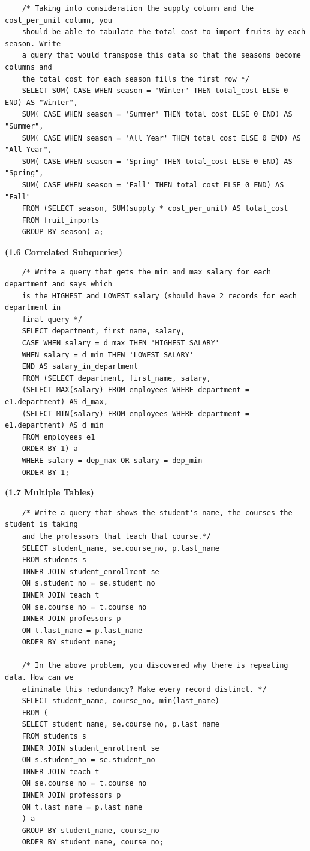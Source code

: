 \documentclass[11pt, a4paper]{article}
\begin{document}
\begin{spacing}{1.1}
\begin{lstlisting}
	/* Taking into consideration the supply column and the cost_per_unit column, you 
	should be able to tabulate the total cost to import fruits by each season. Write 
	a query that would transpose this data so that the seasons become columns and 
	the total cost for each season fills the first row */
	SELECT SUM( CASE WHEN season = 'Winter' THEN total_cost ELSE 0 END) AS "Winter",
	SUM( CASE WHEN season = 'Summer' THEN total_cost ELSE 0 END) AS "Summer",
	SUM( CASE WHEN season = 'All Year' THEN total_cost ELSE 0 END) AS "All Year",
	SUM( CASE WHEN season = 'Spring' THEN total_cost ELSE 0 END) AS "Spring",
	SUM( CASE WHEN season = 'Fall' THEN total_cost ELSE 0 END) AS "Fall"
	FROM (SELECT season, SUM(supply * cost_per_unit) AS total_cost
	FROM fruit_imports
	GROUP BY season) a; \end{lstlisting} \newpage
	\noindent \large \textbf{(1.6 Correlated Subqueries)} \normalsize
	\begin{lstlisting}
	/* Write a query that gets the min and max salary for each department and says which 
	is the HIGHEST and LOWEST salary (should have 2 records for each department in 
	final query */	
	SELECT department, first_name, salary, 
	CASE WHEN salary = d_max THEN 'HIGHEST SALARY'
	WHEN salary = d_min THEN 'LOWEST SALARY'
	END AS salary_in_department
	FROM (SELECT department, first_name, salary, 
	(SELECT MAX(salary) FROM employees WHERE department = e1.department) AS d_max, 
	(SELECT MIN(salary) FROM employees WHERE department = e1.department) AS d_min
	FROM employees e1
	ORDER BY 1) a
	WHERE salary = dep_max OR salary = dep_min
	ORDER BY 1;	\end{lstlisting} \vspace*{6mm}
	\noindent \large \textbf{(1.7 Multiple Tables)} \normalsize
	\begin{lstlisting}
	/* Write a query that shows the student's name, the courses the student is taking 
	and the professors that teach that course.*/
	SELECT student_name, se.course_no, p.last_name 
	FROM students s 
	INNER JOIN student_enrollment se 
	ON s.student_no = se.student_no
	INNER JOIN teach t 
	ON se.course_no = t.course_no
	INNER JOIN professors p 
	ON t.last_name = p.last_name
	ORDER BY student_name;
	
	/* In the above problem, you discovered why there is repeating data. How can we 
	eliminate this redundancy? Make every record distinct. */
	SELECT student_name, course_no, min(last_name)
	FROM (
	SELECT student_name, se.course_no, p.last_name 
	FROM students s 
	INNER JOIN student_enrollment se 
	ON s.student_no = se.student_no
	INNER JOIN teach t 
	ON se.course_no = t.course_no
	INNER JOIN professors p 
	ON t.last_name = p.last_name
	) a
	GROUP BY student_name, course_no
	ORDER BY student_name, course_no;
	

\end{lstlisting}
\end{spacing}
\end{document}
